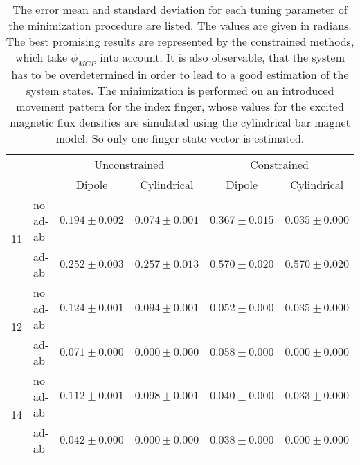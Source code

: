 \begin{table}[h]
\centering
\begin{tabular}{l l c c c c}
\toprule
 & &          				\multicolumn{2}{c}{Unconstrained}          &		\multicolumn{2}{c}{Constrained}\\ \cmidrule(lr){3-4}\cmidrule(lr){5-6}
 & & 								Dipole   			   & Cylindrical 	 			 & 		Dipole 			& 		Cylindrical \\ \midrule[2pt]
\multirow{2}{*}{11} & no ad-ab    & $ 0.194 \pm 0.002 $ & $ 0.074 \pm 0.001 $ & $ 0.367 \pm 0.015 $ & $ 0.035 \pm 0.000 $ \\ 
					& ad-ab		 & $ 0.252 \pm 0.003 $ & $ 0.257 \pm 0.013 $ & $ 0.570 \pm 0.020 $ & $ 0.570 \pm 0.020 $ \\ \midrule
\multirow{2}{*}{12} & no ad-ab    & $ 0.124 \pm 0.001 $ & $ 0.094 \pm 0.001 $ & $ 0.052 \pm 0.000 $ & $ 0.035 \pm 0.000 $ \\ 
					& ad-ab		 & $ 0.071 \pm 0.000 $ & $ 0.000 \pm 0.000 $ & $ 0.058 \pm 0.000 $ & $ 0.000 \pm 0.000 $\\ \midrule
\multirow{2}{*}{14} & no ad-ab    & $ 0.112 \pm 0.001 $ & $ 0.098 \pm 0.001 $ & $ 0.040 \pm 0.000 $ & $ 0.033 \pm 0.000 $ \\ 
					& ad-ab		 & $ 0.042 \pm 0.000 $ & $ 0.000 \pm 0.000 $ & $ 0.038 \pm 0.000 $ & $ 0.000 \pm 0.000 $\\										
\bottomrule
\end{tabular}
\caption[Quality of the minimization method for estimating one finger]
{The error mean and standard deviation for each tuning parameter of the minimization procedure are listed. The values are given in radians. The best promising results are represented by the constrained methods, which take $ \phi_{MCP} $ into account. It is also observable, that the system has to be overdetermined in order to lead to a good estimation of the system states. The minimization is performed on an introduced movement pattern for the index finger, whose values for the excited magnetic flux densities are simulated using the cylindrical bar magnet model. So only one finger state vector is estimated.}
\label{tab:oneFing}
\end{table}
